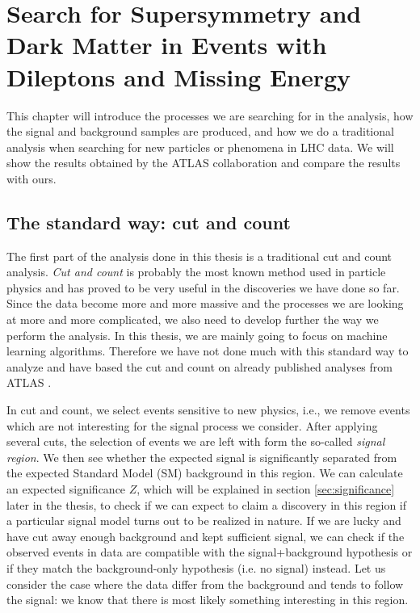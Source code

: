 \chapter{Search for Supersymmetry and Dark Matter in Events with Dileptons and Missing Energy}
\label{sec:CandCanalysis}


This chapter will introduce the processes we are searching for in the analysis, how the signal and background samples are produced, and how we do a traditional analysis when searching for new particles or phenomena in LHC data. We will show the results obtained by the ATLAS collaboration and compare the results with ours. 




\section{The standard way: cut and count}
\label{sec:candc}

The first part of the analysis done in this thesis is a traditional cut and count analysis. \textit{Cut and count} is probably the most known method used in particle physics and has proved to be very useful in the discoveries we have done so far. Since the data become more and more massive and the processes we are looking at more and more complicated, we also need to develop further the way we perform the analysis. In this thesis, we are mainly going to focus on machine learning algorithms. Therefore we have not done much with this standard way to analyze and have based the cut and count on already published analyses from ATLAS \cite{sleptonexclusion, monoZexclusion}. 

In cut and count, we select events sensitive to new physics, i.e., we remove events which are not interesting for the signal process we consider. After applying several cuts, the selection of events we are left with form the so-called \textit{signal region}. We then see whether the expected signal is significantly separated from the expected Standard Model (SM) background in this region. We can calculate an expected significance $Z$, which will be explained in section \ref{sec:significance} later in the thesis, to check if we can expect to claim a discovery in this region if a particular signal model turns out to be realized in nature. If we are lucky and have cut away enough background and kept sufficient signal, we can check if the observed events in data are compatible with the signal+background hypothesis or if they match the background-only hypothesis (i.e. no signal) instead. Let us consider the case where the data differ from the background and tends to follow the signal: we know that there is most likely something interesting in this region.

